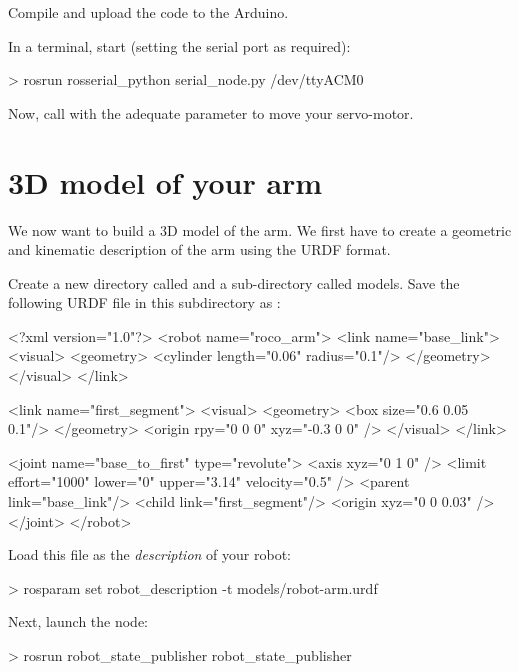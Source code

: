 \documentclass{instructions}
\begin{document}
Compile and upload the code to the Arduino.

In a terminal, start  (setting the serial port as required):

\begin{shcode}
> rosrun rosserial_python serial_node.py /dev/ttyACM0
\end{shcode}

Now, call  with the adequate parameter to move your servo-motor.

\part{3D model of your arm}

We now want to build a 3D model of the arm. We first have to create a geometric
and kinematic description of the arm using the URDF format.


Create a new directory called  and a sub-directory called
{models}. Save the following URDF file in this subdirectory as
:

\begin{xmlcode}
<?xml version="1.0"?>
<robot name="roco_arm">
  <link name="base_link">
    <visual>
      <geometry>
        <cylinder length="0.06" radius="0.1"/>
      </geometry>
    </visual>
  </link>

  <link name="first_segment">
    <visual>
      <geometry>
        <box size="0.6 0.05 0.1"/>
      </geometry>
      <origin rpy="0 0 0" xyz="-0.3 0 0" />
    </visual>
  </link>

  <joint name="base_to_first" type="revolute">
    <axis xyz="0 1 0" />
    <limit effort="1000" lower="0"
                    upper="3.14" velocity="0.5" />
    <parent link="base_link"/>
    <child link="first_segment"/>
    <origin xyz="0 0 0.03" />
  </joint>
</robot>
\end{xmlcode}

Load this file as the \emph{description} of your robot: 

\begin{shcode}
> rosparam set robot_description -t models/robot-arm.urdf
\end{shcode}

Next, launch the  node:

\begin{shcode}
> rosrun robot_state_publisher robot_state_publisher
\end{shcode}
\end{document}
